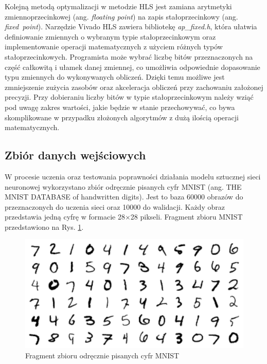 Kolejną metodą optymalizacji w metodzie HLS jest zamiana arytmetyki zmiennoprzecinkowej (ang. \emph{floating point}) na zapis 
stałoprzecinkowy (ang. \emph{fixed\ point}). Narzędzie Vivado HLS zawiera bibliotekę \emph{ap\_fixed.h}, która ułatwia 
definiowanie zmiennych o wybranym typie stałoprzecinkowym oraz implementowanie operacji matematycznych z użyciem różnych 
typów stałoprzecinkowych. Programista może wybrać liczbę bitów przeznaczonych na część całkowitą i ułamek danej zmiennej, co umożliwia odpowiednie dopasowanie typu zmiennych do wykonywanych obliczeń. Dzięki temu możliwe jest zmniejszenie zużycia zasobów oraz akceleracja obliczeń przy zachowaniu założonej precyzji. Przy dobieraniu liczby bitów w typie stałoprzecinkowym należy wziąć pod uwagę zakres wartości, jakie będzie w stanie przechowywać, co bywa skomplikowane w przypadku złożonych algorytmów z dużą ilością operacji matematycznych. 


\subsection{Zbiór danych wejściowych}

W procesie uczenia oraz testowania poprawności działania modelu sztucznej 
sieci neuronowej wykorzystano zbiór odręcznie pisanych cyfr MNIST 
(ang. THE MNIST DATABASE of handwritten digits)\cite{lecun-mnisthandwrittendigit-2010}. Jest to baza 60000 obrazów do 
przeznaczonych do uczenia sieci oraz 10000 do walidacji. Każdy obraz przedstawia jedną cyfrę w formacie 28$\times$28 pikseli. 
Fragment zbioru MNIST przedstawiono na Rys. \ref{mnist-set}.

\begin{figure}[!h]
  \centering
  \includegraphics[width=\textwidth]{img/mnist.png}
  \caption{Fragment zbioru odręcznie pisanych cyfr MNIST}
  \label{mnist-set}
\end{figure}

